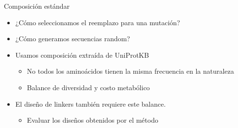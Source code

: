 \documentclass{beamer}
\begin{document}
\begin{frame}[plain]{Composición estándar}
\begin{itemize}
 \item ¿Cómo seleccionamos el reemplazo para una mutación?
 \item ¿Cómo generamos secuencias random?
 \item Usamos composición extraída de UniProtKB
 \begin{itemize}
  \item No todos los aminoácidos tienen la misma frecuencia en la naturaleza
  \item Balance de diversidad y costo metabólico
  \end{itemize}
 \item El diseño de linkers también requiere este balance. 
 \begin{itemize}
 \item Evaluar los diseños obtenidos por el método
 \end{itemize}

\end{itemize}

\end{frame}
\end{document}
